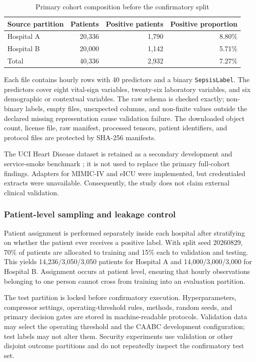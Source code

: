 \begin{table}[htbp]
\centering
\caption{Primary cohort composition before the confirmatory split}
\label{tab:cohort-composition}
\small
\begin{tabular}{@{}lrrr@{}}
\toprule
Source partition & Patients & Positive patients & Positive proportion \\
\midrule
Hospital A & 20,336 & 1,790 & 8.80\% \\
Hospital B & 20,000 & 1,142 & 5.71\% \\
\midrule
Total & 40,336 & 2,932 & 7.27\% \\
\bottomrule
\end{tabular}
\end{table}

Each file contains hourly rows with 40 predictors and a binary \texttt{SepsisLabel}. The predictors cover eight vital-sign variables, twenty-six laboratory variables, and six demographic or contextual variables. The raw schema is checked exactly; non-binary labels, empty files, unexpected columns, and non-finite values outside the declared missing representation cause validation failure. The downloaded object count, license file, raw manifest, processed tensors, patient identifiers, and protocol files are protected by SHA-256 manifests.

The UCI Heart Disease dataset is retained as a secondary development and service-smoke benchmark \cite{janosi1989heart}; it is not used to replace the primary full-cohort findings. Adapters for MIMIC-IV and eICU were implemented, but credentialed extracts were unavailable. Consequently, the study does not claim external clinical validation.

\subsubsection{Patient-level sampling and leakage control}

Patient assignment is performed separately inside each hospital after stratifying on whether the patient ever receives a positive label. With split seed 20260829, 70\% of patients are allocated to training and 15\% each to validation and testing. This yields 14,236/3,050/3,050 patients for Hospital A and 14,000/3,000/3,000 for Hospital B. Assignment occurs at patient level, ensuring that hourly observations belonging to one person cannot cross from training into an evaluation partition.

The test partition is locked before confirmatory execution. Hyperparameters, compressor settings, operating-threshold rules, methods, random seeds, and primary decision gates are stored in machine-readable protocols. Validation data may select the operating threshold and the CAABC development configuration; test labels may not alter them. Security experiments use validation or other disjoint outcome partitions and do not repeatedly inspect the confirmatory test set.

